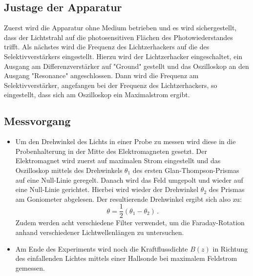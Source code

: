 \subsection{Justage der Apparatur}
Zuerst wird die Apparatur ohne Medium betrieben und es wird sichergestellt, dass der Lichtstrahl
auf die photosensitiven Flächen des Photowiederstandes trifft. Als nächstes wird die Frequenz
des Lichtzerhackers auf die des Selektivverstärkers eingestellt. Hierzu wird der Lichtzerhacker
eingeschaltet, ein Ausgang am Differenzverstärker auf "Ground" gestellt und das Oszilloskop an den
Ausgang "Resonance" angeschlossen. Dann wird die Frequenz am Selektivverstärker, angefangen
bei der Frequenz des Lichtzerhackers, so eingestellt, dass sich am Oszilloskop ein Maximalstrom
ergibt.
\subsection{Messvorgang}
\begin{itemize}
	\item Um den Drehwinkel des Lichts in einer Probe zu messen wird diese in die Probenhalterung in der Mitte des Elektromagneten gesetzt.
	Der Elektromagnet  wird zuerst auf maximalen Strom eingestellt und das Oszilloskop mittels des Drehwinkels $\theta_1$
		des ersten Glan-Thompson-Prismas auf eine Null-Linie geregelt. Danach wird das
		Feld umgepolt und wieder auf eine Null-Linie gerichtet. Hierbei wird wieder der
		Drehwinkel $\theta_2$ des Prismas am Goniometer abgelesen. Der resultierende
		Drehwinkel ergibt sich also zu:
		\begin{equation*}
			\theta = \frac{1}{2}(\theta_1-\theta_2) \, \mathrm{.}
		\end{equation*}
		Zudem werden acht verschiedene Filter verwendet, um die Faraday-Rotation anhand verschiedener Lichtwellenlängen zu untersuchen.
	\item Am Ende des Experiments wird noch die Kraftflussdichte $B(z)$ in Richtung des
		einfallenden Lichtes mittels einer Hallsonde bei maximalem Feldstrom gemessen.
\end{itemize}
